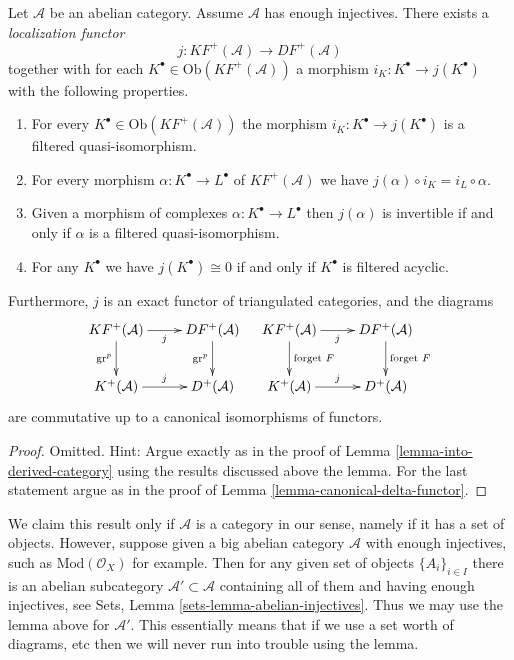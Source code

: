 \begin{lemma}
\label{lemma-filtered-localization-functor}
Let $\mathcal{A}$ be an abelian category.
Assume $\mathcal{A}$ has enough injectives.
There exists a {\it localization functor}
$$
j : KF^{+}(\mathcal{A}) \longrightarrow DF^{+}(\mathcal{A})
$$
together with for each $K^\bullet \in \text{Ob}(KF^{+}(\mathcal{A}))$
a morphism $i_K : K^\bullet \to j(K^\bullet)$ with the following properties.
\begin{enumerate}
\item For every $K^\bullet \in \text{Ob}(KF^{+}(\mathcal{A}))$ the morphism
$i_K : K^\bullet \to j(K^\bullet)$
is a filtered quasi-isomorphism.
\item For every morphism $\alpha : K^\bullet \to L^\bullet$ of
$KF^{+}(\mathcal{A})$ we have $j(\alpha) \circ i_K = i_L \circ \alpha$.
\item Given a morphism of complexes $\alpha : K^\bullet \to L^\bullet$
then $j(\alpha)$ is invertible if and only if $\alpha$ is a
filtered quasi-isomorphism.
\item For any $K^\bullet$ we have $j(K^\bullet) \cong 0$ if and only
if $K^\bullet$ is filtered acyclic.
\end{enumerate}
Furthermore, $j$ is an exact functor of triangulated categories,
and the diagrams
$$
\xymatrix{
KF^{+}(\mathcal{A}) \ar[d]_{\text{gr}^p} \ar[r]_j &
DF^{+}(\mathcal{A}) \ar[d]_{\text{gr}^p} \\
K^{+}(\mathcal{A}) \ar[r]^j &
D^{+}(\mathcal{A})
}
\quad
\xymatrix{
KF^{+}(\mathcal{A}) \ar[d]^{\text{forget }F} \ar[r]_j &
DF^{+}(\mathcal{A}) \ar[d]^{\text{forget }F} \\
K^{+}(\mathcal{A}) \ar[r]^j &
D^{+}(\mathcal{A})
}
$$
are commutative up to a canonical isomorphisms of functors.
\end{lemma}

\begin{proof}
Omitted. Hint: Argue exactly as in the proof of
Lemma \ref{lemma-into-derived-category}
using the results discussed above the lemma.
For the last statement argue as in the proof of
Lemma \ref{lemma-canonical-delta-functor}.
\end{proof}

\begin{remark}
\label{remark-filtered-localization-big}
We claim this result only if $\mathcal{A}$ is a category in our sense,
namely if it has a set of objects. However, suppose given a big abelian
category $\mathcal{A}$ with enough injectives, such as
$\text{Mod}(\mathcal{O}_X)$ for example. Then for any given set of objects
$\{A_i\}_{i\in I}$ there is an abelian subcategory
$\mathcal{A}' \subset \mathcal{A}$ containing all of them
and having enough injectives, see
Sets, Lemma \ref{sets-lemma-abelian-injectives}.
Thus we may use the lemma above for $\mathcal{A}'$.
This essentially means that if we use a set worth of diagrams, etc 
then we will never run into trouble using the lemma.
\end{remark}

